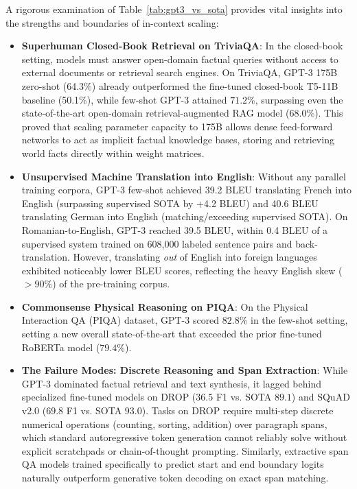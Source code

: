 \documentclass[../../main.tex]{subfiles}
\begin{document}
A rigorous examination of Table~\ref{tab:gpt3_vs_sota} provides vital insights into the strengths and boundaries of in-context scaling:
\begin{itemize}
    \item \textbf{Superhuman Closed-Book Retrieval on TriviaQA}: In the closed-book setting, models must answer open-domain factual queries without access to external documents or retrieval search engines. On TriviaQA, GPT-3 175B zero-shot (64.3\%) already outperformed the fine-tuned closed-book T5-11B baseline (50.1\%), while few-shot GPT-3 attained $71.2\%$, surpassing even the state-of-the-art open-domain retrieval-augmented RAG model ($68.0\%$). This proved that scaling parameter capacity to 175B allows dense feed-forward networks to act as implicit factual knowledge bases, storing and retrieving world facts directly within weight matrices.
    
    \item \textbf{Unsupervised Machine Translation into English}: Without any parallel training corpora, GPT-3 few-shot achieved 39.2 BLEU translating French into English (surpassing supervised SOTA by +4.2 BLEU) and 40.6 BLEU translating German into English (matching/exceeding supervised SOTA). On Romanian-to-English, GPT-3 reached 39.5 BLEU, within 0.4 BLEU of a supervised system trained on 608,000 labeled sentence pairs and back-translation. However, translating \emph{out} of English into foreign languages exhibited noticeably lower BLEU scores, reflecting the heavy English skew ($>90\%$) of the pre-training corpus.
    
    \item \textbf{Commonsense Physical Reasoning on PIQA}: On the Physical Interaction QA (PIQA) dataset, GPT-3 scored $82.8\%$ in the few-shot setting, setting a new overall state-of-the-art that exceeded the prior fine-tuned RoBERTa model ($79.4\%$).
    
    \item \textbf{The Failure Modes: Discrete Reasoning and Span Extraction}: While GPT-3 dominated factual retrieval and text synthesis, it lagged behind specialized fine-tuned models on DROP ($36.5$ F1 vs. SOTA $89.1$) and SQuAD v2.0 ($69.8$ F1 vs. SOTA $93.0$). Tasks on DROP require multi-step discrete numerical operations (counting, sorting, addition) over paragraph spans, which standard autoregressive token generation cannot reliably solve without explicit scratchpads or chain-of-thought prompting. Similarly, extractive span QA models trained specifically to predict start and end boundary logits naturally outperform generative token decoding on exact span matching.
\end{itemize}
\end{document}
